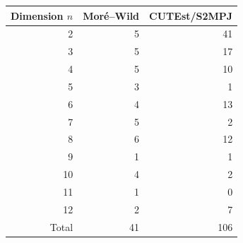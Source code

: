 \begin{tabular}{rrr}
\toprule
Dimension $n$ & Mor\'e--Wild & CUTEst/S2MPJ \\
\midrule
2 & 5 & 41 \\
3 & 5 & 17 \\
4 & 5 & 10 \\
5 & 3 & 1 \\
6 & 4 & 13 \\
7 & 5 & 2 \\
8 & 6 & 12 \\
9 & 1 & 1 \\
10 & 4 & 2 \\
11 & 1 & 0 \\
12 & 2 & 7 \\
\midrule
Total & 41 & 106 \\
\bottomrule
\end{tabular}
